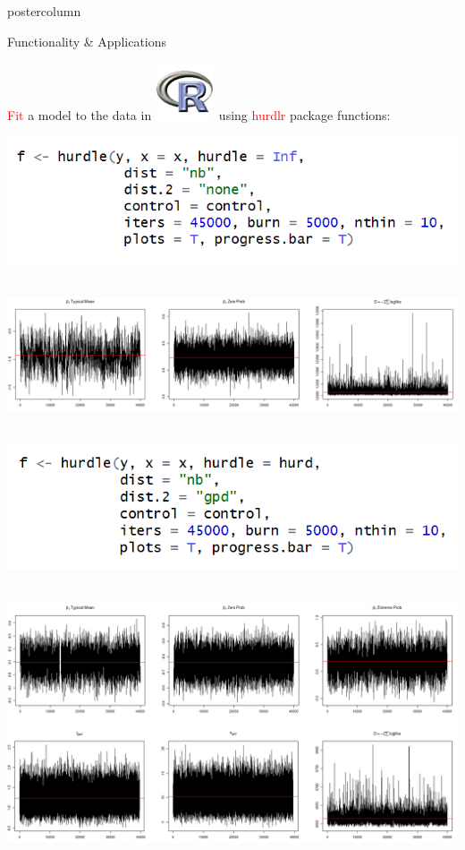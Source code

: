 \documentclass[final]{beamer}\usepackage[]{graphicx}\usepackage[]{color}
\newcommand{\red}{\textcolor{red}}
\begin{document}
{\begin{frame}
\begin{columns}
\begin{column}{.33\textwidth}
\begin{beamercolorbox}[center,wd=\textwidth]{postercolumn}
\begin{minipage}[T]{.97\textwidth}
{\begin{block}{Functionality \& Applications}
\begin{minipage}[t][0.01mm]{.97\textwidth}
	\red{Fit} a model to the data in \includegraphics[scale=.55]{miscPP.png}\ using \red{hurdlr} package functions:
\end{minipage}

\vspace{1cm}

	
\includegraphics[scale=1.4]{code2.png}\ \

\vspace{0.4cm}

\includegraphics[scale=0.8]{plots2.png}\ \

\vspace{1.2cm}

\includegraphics[scale=1.4]{code1.png}\ \

\vspace{0.6cm}

\includegraphics[scale=0.8]{plots4.png}\ \


\end{block}}
\end{minipage}
\end{beamercolorbox}
\end{column}
\end{columns}
\end{frame}}
\end{document}
